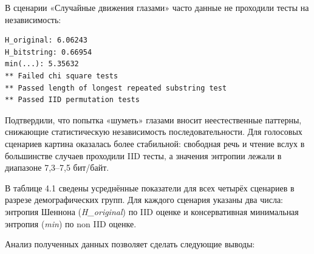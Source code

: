 \documentclass[14pt, a4paper]{extreport}
\begin{document}
В сценарии «Случайные движения глазами» часто данные не проходили тесты на независимость:

\begin{verbatim}
H_original: 6.06243
H_bitstring: 0.66954
min(...): 5.35632
** Failed chi square tests
** Passed length of longest repeated substring test
** Passed IID permutation tests
\end{verbatim}

Подтвердили, что попытка «шуметь» глазами вносит неестественные паттерны, снижающие статистическую независимость последовательности. Для голосовых сценариев картина оказалась более стабильной: свободная речь и чтение вслух в большинстве случаев проходили IID тесты, а значения энтропии лежали в диапазоне 7,3–7,5 бит/байт.

В таблице 4.1 сведены усреднённые показатели для всех четырёх сценариев в разрезе демографических групп. Для каждого сценария указаны два числа: энтропия Шеннона (\textit{H\_original}) по IID оценке и консервативная минимальная энтропия (\textit{min}) по non IID оценке.

\begin{table}[H]
\centering
\caption{Сравнение показателей энтропии для разных сценариев и групп}
\label{tab:entropy_results}
\medskip
\end{table}

Анализ полученных данных позволяет сделать следующие выводы:
\end{document}
